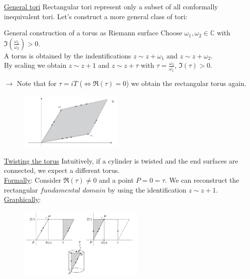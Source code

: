 \documentclass[11pt,aspectratio=169]{beamer}
\begin{document}
\begin{frame}{\underline{General tori}}
	Rectangular tori represent only a subset of all conformally inequivalent tori. Let's construct a more general class of tori:
	\\
	\begin{block}{General construction of a torus as Riemann surface}
		Choose $\omega_1, \omega_2 \in \mathbb{C}$ with $\Im(\frac{\omega_1}{\omega_2}) > 0$.
		\\
		A torus is obtained by the indentifications $z \sim z + \omega_1$ and $z \sim z + \omega_2$.
		\\
		By scaling we obtain $z \sim z + 1$ and $z \sim z + \tau$ with $\tau = \frac{\omega_2}{\omega_1}$, $\Im(\tau) >0$.
	\end{block}
	$\rightarrow$ Note that for $\tau = iT$ ($\Leftrightarrow \Re(\tau) = 0$) we obtain the rectangular torus again.
	\begin{figure}[htbp]
		\centering
		\includegraphics[width = 0.45\textwidth]{elements/general torus.PNG}
	\end{figure}
\end{frame}

\begin{frame}{\underline{Twisting the torus}}
	Intuitively, if a cylinder is twisted and the end surfaces are connected, we expect a different torus. 
	\\
	\underline{Formally}: Consider $\Re(\tau) \neq 0$ and a point $P = 0 = \tau$. We can reconstruct the rectangular $\textit{fundamental domain}$ by using the identification $z \sim z + 1$.
	\\
	\underline{Graphically}:
	\begin{figure}[htbp]
		\centering
		\includegraphics[width = 0.55\textwidth]{elements/twisted torus.PNG}
	\end{figure}
	
\end{frame}
\end{document}
